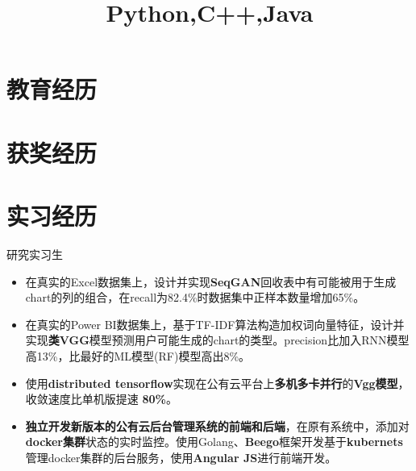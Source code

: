 \documentclass[11pt,a4paper]{moderncv}
\title{Python,C++,Java}
\begin{document}
\maketitle
\section{教育经历}

\section{获奖经历}

\section{实习经历}
 {研究实习生}{}{}
{\begin{itemize}
\item 在真实的Excel数据集上，设计并实现\textbf{SeqGAN}回收表中有可能被用于生成chart的列的组合，在recall为82.4\%时数据集中正样本数量增加65\%。
\item 在真实的Power BI数据集上，基于TF-IDF算法构造加权词向量特征，设计并实现\textbf{类VGG}模型预测用户可能生成的chart的类型。precision比加入RNN模型高13\%，比最好的ML模型(RF)模型高出8\%。%
\end{itemize}}

{
\begin{itemize}
\item 使用\textbf{distributed tensorflow}实现在公有云平台上\textbf{多机多卡并行}的\textbf{Vgg模型}，收敛速度比单机版提速 \textbf{80\%}。
\item \textbf{独立开发新版本的公有云后台管理系统的前端和后端}，在原有系统中，添加对\textbf{docker集群}状态的实时监控。使用Golang、\textbf{Beego}框架开发基于\textbf{kubernets}管理docker集群的后台服务，使用\textbf{Angular JS}进行前端开发。
\end{itemize}}
\end{document}
